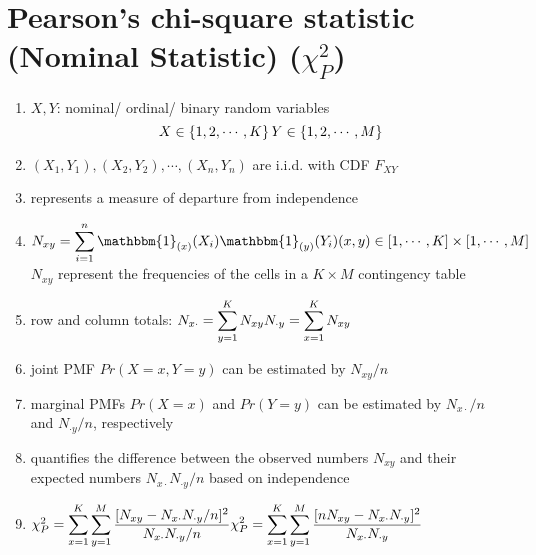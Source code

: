 \section{Pearson’s chi-square statistic (Nominal Statistic) ($\chi_P^2$) \cite{ism-1}} \label{Multivariate Distributions: Pearson’s chi-square statistic (Nominal Statistic)}

\begin{enumerate}
    \item[] $X, Y$: nominal/ ordinal/ binary random variables
    \[
        \hfill
        X \in \dCurlyBrac{1, 2,\cdots, K}
        \hfill
        Y \in \dCurlyBrac{1, 2,\cdots, M}
        \hfill
    \]

    \item[] $(X_1, Y_1), (X_2, Y_2), \cdots , (X_n, Y_n)$ are i.i.d. with CDF $F_{XY}$

    \item represents a measure of departure from independence

    \item $
        N_{xy}
        = \dsum_{i=1}^{n} 
        \mathbbm{1}_{(x)}(X_i)
        \mathbbm{1}_{(y)}(Y_i)
        \hfill
        (x,y) \in [1,\cdots,K] \times [1,\cdots,M]
    $\\
    $N_{xy}$ represent the frequencies of the cells in a $K \times M$ contingency table
    
    \item row and column totals: $
        \hfill
        N_{x\cdot} = \dsum_{y=1}^{K} N_{xy}
        \hfill
        N_{\cdot y} = \dsum_{x=1}^{K} N_{xy}
        \hfill
    $

    \item joint PMF $Pr(X = x, Y = y)$ can be estimated by $N_{xy}/n$

    \item marginal PMFs $Pr(X = x)$ and $Pr(Y = y)$ can be estimated by $N_{x\cdot}/n$ and $N_{\cdot y}/n$, respectively

    \item quantifies the difference between the observed numbers $N_{xy}$ and their expected numbers $N_{x\cdot}N_{\cdot y}/n$ based on independence

    \item $
        \hfill
        \chi_P^2 = \dsum_{x=1}^{K} \dsum_{y=1}^{M}
        \dfrac{[N_{xy} - N_{x\cdot}N_{\cdot y}/n]^2}{N_{x\cdot}N_{\cdot y}/n}
        \hfill
        \chi_P^2 = \dsum_{x=1}^{K} \dsum_{y=1}^{M}
        \dfrac{[nN_{xy} - N_{x\cdot}N_{\cdot y}]^2}{N_{x\cdot}N_{\cdot y}}
        \hfill
    $


\end{enumerate}
